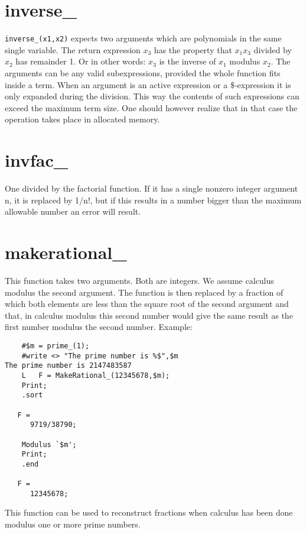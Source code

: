 
\section{inverse\_}
\label{funinverse}
\noindent \verb:inverse_(x1,x2): expects two arguments which are 
polynomials in the same single variable. The return expression $x_3$ 
has the property that $x_1 x_3$ divided by $x_2$ has remainder 1. Or in 
other words: $x_3$ is the inverse of $x_1$ modulus $x_2$.
The arguments can be any valid subexpressions, provided the whole function 
fits inside a term. When an argument is an active expression or a 
\$-expression it is only expanded during the division. This way the 
contents of such expressions can exceed the maximum term size. One should 
however realize that in that case the operation takes place in allocated 
memory. 


\section{invfac\_}
\label{funinvfac}
\noindent One divided by the factorial function. If it has 
a single nonzero integer argument n, it is replaced by 1/n!, but if this 
results in a number bigger than the maximum allowable number an error will 
result.


\section{makerational\_}
\label{funmakerational}

\noindent This function takes two arguments. Both are integers. We assume 
calculus modulus the second argument. The function is then replaced by a 
fraction of which both elements are less than the square root of the second 
argument and that, in calculus modulus this second number would give the 
same result as the first number modulus the second number. Example:
\begin{verbatim}
    #$m = prime_(1);
    #write <> "The prime number is %$",$m
The prime number is 2147483587
    L	F = MakeRational_(12345678,$m);
    Print;
    .sort

   F =
      9719/38790;

    Modulus `$m';
    Print;
    .end

   F =
      12345678;
\end{verbatim}
\noindent This function can be used to reconstruct fractions when calculus 
has been done modulus one or more prime numbers.

